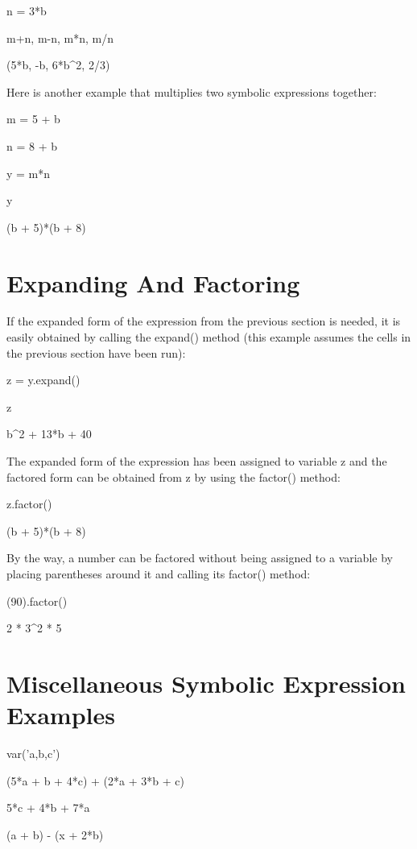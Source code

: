 \documentclass[12pt,oneside]{book}
\begin{document}
n = 3*b

m+n, m{}-n, m*n, m/n

{\textbar}

(5*b, {}-b, 6*b\^{}2, 2/3)

Here is another example that multiplies two symbolic expressions together: 

m = 5 + b

n = 8 + b

y = m*n

y

{\textbar}

(b + 5)*(b + 8)

\section[Expanding And Factoring]{Expanding And Factoring}

If the expanded form of the expression from the previous section is needed, it is easily obtained by calling the expand() method (this example assumes the cells in the previous section have been run): 

z = y.expand()

z

{\textbar}

b\^{}2 + 13*b + 40

The expanded form of the expression has been assigned to variable z and the factored form can be obtained from z by using the factor() method: 

z.factor()

{\textbar}

(b + 5)*(b + 8)

By the way, a number can be factored without being assigned to a variable by placing parentheses around it and calling its factor() method: 

(90).factor()

{\textbar}

2 * 3\^{}2 * 5

\section[Miscellaneous Symbolic Expression Examples]{ Miscellaneous Symbolic Expression Examples} 

var('a,b,c')


(5*a + b + 4*c) + (2*a + 3*b + c)

{\textbar}

5*c + 4*b + 7*a

(a + b) {}- (x + 2*b)
\end{document}
